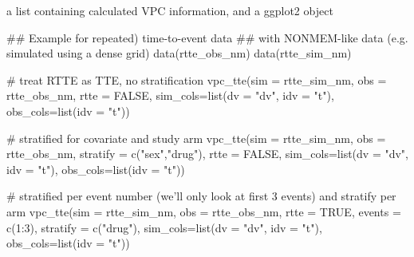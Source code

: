 \documentclass[letterpaper]{book}
\begin{document}
%
\begin{Value}
a list containing calculated VPC information, and a ggplot2 object
\end{Value}
%
\begin{SeeAlso}\relax
{}
\end{SeeAlso}
%
\begin{Examples}
\begin{ExampleCode}
## Example for repeated) time-to-event data
## with NONMEM-like data (e.g. simulated using a dense grid)
data(rtte_obs_nm)
data(rtte_sim_nm)

# treat RTTE as TTE, no stratification
vpc_tte(sim = rtte_sim_nm,
        obs = rtte_obs_nm,
        rtte = FALSE,
        sim_cols=list(dv = "dv", idv = "t"), obs_cols=list(idv = "t"))

# stratified for covariate and study arm
vpc_tte(sim = rtte_sim_nm,
        obs = rtte_obs_nm,
        stratify = c("sex","drug"),
        rtte = FALSE,
        sim_cols=list(dv = "dv", idv = "t"), obs_cols=list(idv = "t"))

# stratified per event number (we'll only look at first 3 events) and stratify per arm
vpc_tte(sim = rtte_sim_nm,
        obs = rtte_obs_nm,
        rtte = TRUE, events = c(1:3),
        stratify = c("drug"),
        sim_cols=list(dv = "dv", idv = "t"), obs_cols=list(idv = "t"))
\end{ExampleCode}
\end{Examples}
\printindex{}
\end{document}
